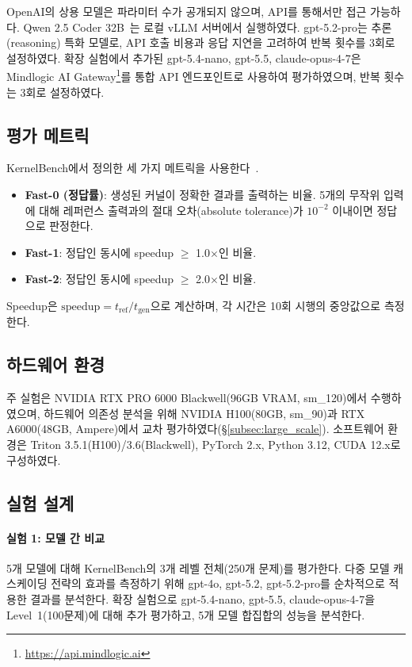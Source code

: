 \documentclass[sigplan,screen,review,anonymous]{acmart}
\begin{document}
OpenAI의 상용 모델은 파라미터 수가 공개되지 않으며, API를 통해서만 접근 가능하다. Qwen 2.5 Coder 32B~\cite{hui2024qwencoder}는 로컬 vLLM 서버에서 실행하였다. gpt-5.2-pro는 추론(reasoning) 특화 모델로, API 호출 비용과 응답 지연을 고려하여 반복 횟수를 3회로 설정하였다. 확장 실험에서 추가된 gpt-5.4-nano, gpt-5.5, claude-opus-4-7은 Mindlogic AI Gateway\footnote{\url{https://api.mindlogic.ai}}를 통합 API 엔드포인트로 사용하여 평가하였으며, 반복 횟수는 3회로 설정하였다.

\subsection{평가 메트릭}

KernelBench에서 정의한 세 가지 메트릭을 사용한다~\cite{ouyang2024kernelbench}.

\begin{itemize}
    \item \textbf{Fast-0 (정답률)}: 생성된 커널이 정확한 결과를 출력하는 비율. 5개의 무작위 입력에 대해 레퍼런스 출력과의 절대 오차(absolute tolerance)가 $10^{-2}$ 이내이면 정답으로 판정한다.
    \item \textbf{Fast-1}: 정답인 동시에 speedup $\geq$ 1.0$\times$인 비율.
    \item \textbf{Fast-2}: 정답인 동시에 speedup $\geq$ 2.0$\times$인 비율.
\end{itemize}

Speedup은 $\text{speedup} = t_{\text{ref}} / t_{\text{gen}}$으로 계산하며, 각 시간은 10회 시행의 중앙값으로 측정한다.

\subsection{하드웨어 환경}

주 실험은 NVIDIA RTX PRO 6000 Blackwell(96GB VRAM, sm\_120)에서 수행하였으며,
하드웨어 의존성 분석을 위해 NVIDIA H100(80GB, sm\_90)과 RTX A6000(48GB, Ampere)에서 교차 평가하였다(\S\ref{subsec:large_scale}).
소프트웨어 환경은 Triton 3.5.1(H100)/3.6(Blackwell), PyTorch 2.x, Python 3.12, CUDA 12.x로 구성하였다.

\subsection{실험 설계}

\paragraph{실험 1: 모델 간 비교} 5개 모델에 대해 KernelBench의 3개 레벨 전체(250개 문제)를 평가한다. 다중 모델 캐스케이딩 전략의 효과를 측정하기 위해 gpt-4o, gpt-5.2, gpt-5.2-pro를 순차적으로 적용한 결과를 분석한다. 확장 실험으로 gpt-5.4-nano, gpt-5.5, claude-opus-4-7을 Level~1(100문제)에 대해 추가 평가하고, 5개 모델 합집합의 성능을 분석한다.
\end{document}
